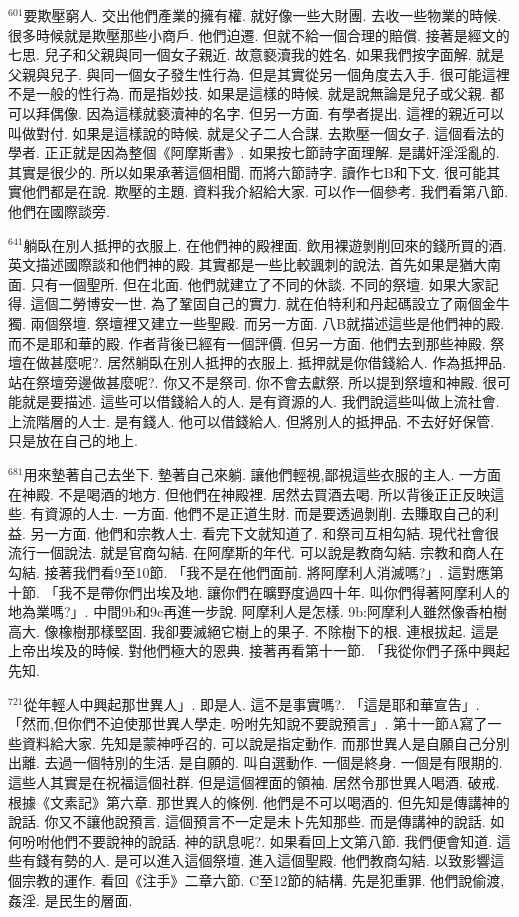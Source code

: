 \documentclass{book}
\begin{document}
$^{601}$要欺壓窮人.
交出他們產業的擁有權.
就好像一些大財團.
去收一些物業的時候.
很多時候就是欺壓那些小商戶.
他們迫遷.
但就不給一個合理的賠償.
接著是經文的七思.
兒子和父親與同一個女子親近.
故意褻瀆我的姓名.
如果我們按字面解.
就是父親與兒子.
與同一個女子發生性行為.
但是其實從另一個角度去入手.
很可能這裡不是一般的性行為.
而是指妙技.
如果是這樣的時候.
就是說無論是兒子或父親.
都可以拜偶像.
因為這樣就褻瀆神的名字.
但另一方面.
有學者提出.
這裡的親近可以叫做對付.
如果是這樣說的時候.
就是父子二人合謀.
去欺壓一個女子.
這個看法的學者.
正正就是因為整個《阿摩斯書》.
如果按七節詩字面理解.
是講奸淫淫亂的.
其實是很少的.
所以如果承著這個相聞.
而將六節詩字.
讀作七B和下文.
很可能其實他們都是在說.
欺壓的主題.
資料我介紹給大家.
可以作一個參考.
我們看第八節.
他們在國際談旁.

$^{641}$躺臥在別人抵押的衣服上.
在他們神的殿裡面.
飲用裸遊剝削回來的錢所買的酒.
英文描述國際談和他們神的殿.
其實都是一些比較諷刺的說法.
首先如果是猶大南面.
只有一個聖所.
但在北面.
他們就建立了不同的休談.
不同的祭壇.
如果大家記得.
這個二勞博安一世.
為了鞏固自己的實力.
就在伯特利和丹起碼設立了兩個金牛獨.
兩個祭壇.
祭壇裡又建立一些聖殿.
而另一方面.
八B就描述這些是他們神的殿.
而不是耶和華的殿.
作者背後已經有一個評價.
但另一方面.
他們去到那些神殿.
祭壇在做甚麼呢?.
居然躺臥在別人抵押的衣服上.
抵押就是你借錢給人.
作為抵押品.
站在祭壇旁邊做甚麼呢?.
你又不是祭司.
你不會去獻祭.
所以提到祭壇和神殿.
很可能就是要描述.
這些可以借錢給人的人.
是有資源的人.
我們說這些叫做上流社會.
上流階層的人士.
是有錢人.
他可以借錢給人.
但將別人的抵押品.
不去好好保管.
只是放在自己的地上.

$^{681}$用來墊著自己去坐下.
墊著自己來躺.
讓他們輕視,鄙視這些衣服的主人.
一方面在神殿.
不是喝酒的地方.
但他們在神殿裡.
居然去買酒去喝.
所以背後正正反映這些.
有資源的人士.
一方面.
他們不是正道生財.
而是要透過剝削.
去賺取自己的利益.
另一方面.
他們和宗教人士.
看完下文就知道了.
和祭司互相勾結.
現代社會很流行一個說法.
就是官商勾結.
在阿摩斯的年代.
可以說是教商勾結.
宗教和商人在勾結.
接著我們看9至10節.
「我不是在他們面前.
將阿摩利人消滅嗎?」.
這對應第十節.
「我不是帶你們出埃及地.
讓你們在曠野度過四十年.
叫你們得著阿摩利人的地為業嗎?」.
中間9b和9c再進一步說.
阿摩利人是怎樣.
9b:阿摩利人雖然像香柏樹高大.
像橡樹那樣堅固.
我卻要滅絕它樹上的果子.
不除樹下的根.
連根拔起.
這是上帝出埃及的時候.
對他們極大的恩典.
接著再看第十一節.
「我從你們子孫中興起先知.

$^{721}$從年輕人中興起那世異人」.
即是人.
這不是事實嗎?.
「這是耶和華宣告」.
「然而,但你們不迫使那世異人學走.
吩咐先知說不要說預言」.
第十一節A寫了一些資料給大家.
先知是蒙神呼召的.
可以說是指定動作.
而那世異人是自願自己分別出離.
去過一個特別的生活.
是自願的.
叫自選動作.
一個是終身.
一個是有限期的.
這些人其實是在祝福這個社群.
但是這個裡面的領袖.
居然令那世異人喝酒.
破戒.
根據《文素記》第六章.
那世異人的條例.
他們是不可以喝酒的.
但先知是傳講神的說話.
你又不讓他說預言.
這個預言不一定是未卜先知那些.
而是傳講神的說話.
如何吩咐他們不要說神的說話.
神的訊息呢?.
如果看回上文第八節.
我們便會知道.
這些有錢有勢的人.
是可以進入這個祭壇.
進入這個聖殿.
他們教商勾結.
以致影響這個宗教的運作.
看回《注手》二章六節.
C至12節的結構.
先是犯重罪.
他們說偷渡,姦淫.
是民生的層面.
\end{document}

